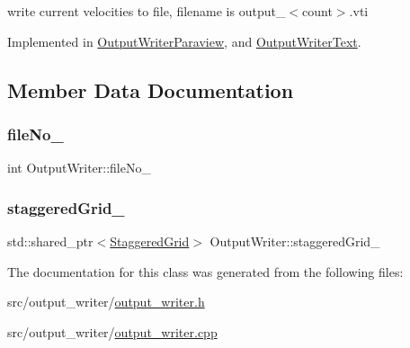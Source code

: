 write current velocities to file, filename is output\+\_\+$<$count$>$.\+vti 



Implemented in \mbox{\hyperlink{classOutputWriterParaview_a9e203b63d0e2f26ad53d18ee1821c6bb}{Output\+Writer\+Paraview}}, and \mbox{\hyperlink{classOutputWriterText_a25a12ea2524fc34e9acb19ef1f4c7431}{Output\+Writer\+Text}}.



\subsection{Member Data Documentation}
\mbox{\label{classOutputWriter_a69d167e2526407602dce26ca7a2b9248}} 
\subsubsection{\texorpdfstring{fileNo\_}{fileNo\_}}
{\footnotesize\ttfamily int Output\+Writer\+::file\+No\+\_\+\hspace{0.3cm}{\ttfamily [protected]}}

\mbox{\label{classOutputWriter_aa4590ca5293e6d74c59f166596e8c878}} 
\subsubsection{\texorpdfstring{staggeredGrid\_}{staggeredGrid\_}}
{\footnotesize\ttfamily std\+::shared\+\_\+ptr$<$\mbox{\hyperlink{classStaggeredGrid}{Staggered\+Grid}}$>$ Output\+Writer\+::staggered\+Grid\+\_\+\hspace{0.3cm}{\ttfamily [protected]}}



The documentation for this class was generated from the following files\+:\begin{DoxyCompactItemize}
\item 
src/output\+\_\+writer/\mbox{\hyperlink{output__writer_8h}{output\+\_\+writer.\+h}}\item 
src/output\+\_\+writer/\mbox{\hyperlink{output__writer_8cpp}{output\+\_\+writer.\+cpp}}\end{DoxyCompactItemize}
